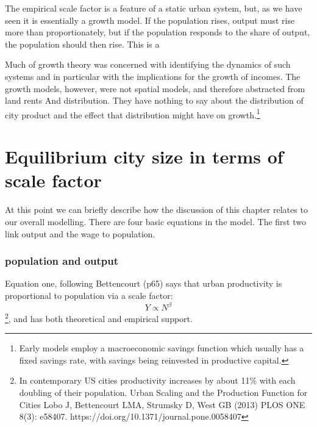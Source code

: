 \vspace{2cm}
The empirical scale factor is a feature of  a static urban system, but, as we have seen it is essentially a growth model. If the population rises, output must rise more than proportionately, but if the population responds to the share of output, the population should then rise. This is a 

Much of growth theory was concerned with identifying the dynamics of such systems and in particular with the implications for the growth of incomes. The growth models, however, were not spatial models, and therefore abstracted from land rents And distribution. They have nothing to say about the distribution of city product and the effect that distribution might have on growth.\footnote{Early models employ a macroeconomic savings function which usually has a fixed savings rate, with savings being reinvested in productive capital. } 

\vspace{2cm}

\section{Equilibrium city size  in terms of scale factor} 
At this point we can briefly describe how the discussion of this chapter relates to our overall modelling. There are four basic equations in the model. The first two link output and the wage to population. 

\subsubsection{population and output}
Equation one, following Bettencourt (p65) says that  urban productivity is proportional to population via a scale factor: 
\[Y\propto N^{\beta}\]  
\footnote{ In contemporary US cities productivity increases by about 11\% with each doubling of their population.  Urban Scaling and the Production Function for Cities Lobo J, Bettencourt LMA, Strumsky D, West GB (2013) PLOS ONE 8(3): e58407. https://doi.org/10.1371/journal.pone.0058407 },
and has both theoretical and empirical support. 


